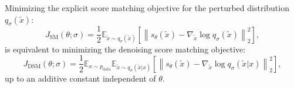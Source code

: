 \begin{theorem}
\label{thm:denoising_score_matching}
Minimizing the explicit score matching objective for the perturbed distribution $q_\sigma(\tilde{x})$:
\begin{equation}
    J_{\text{SM}}(\theta; \sigma) = \frac{1}{2} \mathbb{E}_{\tilde{x} \sim q_\sigma(\tilde{x})} \left[ \left\| s_\theta(\tilde{x}) - \nabla_{\tilde{x}} \log q_\sigma(\tilde{x}) \right\|_2^2 \right],
\end{equation}
is equivalent to minimizing the denoising score matching objective:
\begin{equation}
    J_{\text{DSM}}(\theta; \sigma) = \frac{1}{2} \mathbb{E}_{x \sim p_{\text{data}}} \mathbb{E}_{\tilde{x} \sim q_\sigma(\tilde{x}|x)} \left[ \left\| s_\theta(\tilde{x}) - \nabla_{\tilde{x}} \log q_\sigma(\tilde{x}|x) \right\|_2^2 \right],
\end{equation}
up to an additive constant independent of $\theta$.
\end{theorem}

